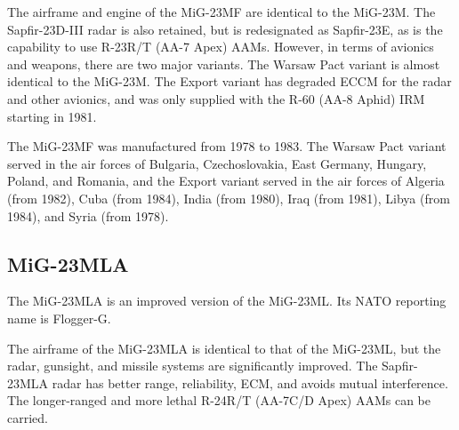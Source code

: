 The airframe and engine of the MiG-23MF are identical to the MiG-23M.
The Sapfir-23D-III radar is also retained, but is redesignated as Sapfir-23E, as is the capability to use R-23R/T (AA-7 Apex) AAMs.
However, in terms of avionics and weapons, there are two major variants.
The Warsaw Pact variant is almost identical to the MiG-23M.
The Export variant has degraded ECCM for the radar and other avionics, and was only supplied with the R-60 (AA-8 Aphid) IRM starting in 1981.%

The MiG-23MF was manufactured from 1978 to 1983.
The Warsaw Pact variant served in the air forces of Bulgaria, Czechoslovakia, East Germany, Hungary, Poland, and Romania, and the Export variant served in the air forces of Algeria (from 1982), Cuba (from 1984), India (from 1980), Iraq (from 1981), Libya (from 1984), and Syria (from 1978).%

\subsection{MiG-23MLA}

The MiG-23MLA is an improved version of the MiG-23ML.
Its NATO reporting name is Flogger-G.%

The airframe of the MiG-23MLA is identical to that of the MiG-23ML, but the radar, gunsight, and missile systems are significantly improved. The Sapfir-23MLA radar has better range, reliability, ECM, and avoids mutual interference. The longer-ranged and more lethal R-24R/T (AA-7C/D Apex) AAMs can be carried.

